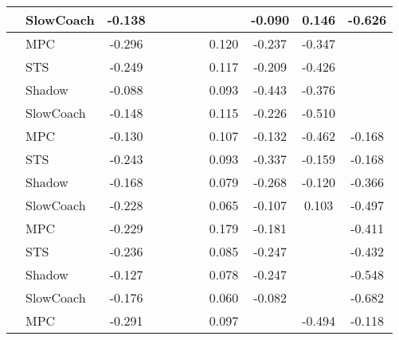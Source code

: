\begin{tabular}{|l|l|*{9}{c|}}
                                                           & SlowCoach &   -0.138 &        &        &     &     &     &  -0.090 &   0.146 &   -0.626 \\
\midrule
[True, False, False, False, False, True, True, True, False] & MPC &   -0.296 &        &        &     &     &  0.120 &  -0.237 &  -0.347 &       \\
                                                           & STS &   -0.249 &        &        &     &     &  0.117 &  -0.209 &  -0.426 &       \\
                                                           & Shadow &   -0.088 &        &        &     &     &  0.093 &  -0.443 &  -0.376 &       \\
                                                           & SlowCoach &   -0.148 &        &        &     &     &  0.115 &  -0.226 &  -0.510 &       \\
\midrule
[True, False, False, False, False, True, True, True, True] & MPC &   -0.130 &        &        &     &     &  0.107 &  -0.132 &  -0.462 &   -0.168 \\
                                                           & STS &   -0.243 &        &        &     &     &  0.093 &  -0.337 &  -0.159 &   -0.168 \\
                                                           & Shadow &   -0.168 &        &        &     &     &  0.079 &  -0.268 &  -0.120 &   -0.366 \\
                                                           & SlowCoach &   -0.228 &        &        &     &     &  0.065 &  -0.107 &   0.103 &   -0.497 \\
\midrule
[True, False, False, False, False, True, True, False, True] & MPC &   -0.229 &        &        &     &     &  0.179 &  -0.181 &      &   -0.411 \\
                                                           & STS &   -0.236 &        &        &     &     &  0.085 &  -0.247 &      &   -0.432 \\
                                                           & Shadow &   -0.127 &        &        &     &     &  0.078 &  -0.247 &      &   -0.548 \\
                                                           & SlowCoach &   -0.176 &        &        &     &     &  0.060 &  -0.082 &      &   -0.682 \\
\midrule
[True, False, False, False, False, True, False, True, True] & MPC &   -0.291 &        &        &     &     &  0.097 &      &  -0.494 &   -0.118 \\

\end{tabular}
